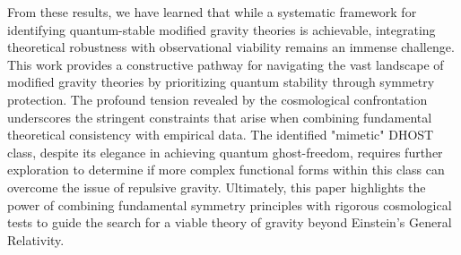 \documentclass[twocolumn]{aastex631}
\begin{document}
From these results, we have learned that while a systematic framework for identifying quantum-stable modified gravity theories is achievable, integrating theoretical robustness with observational viability remains an immense challenge. This work provides a constructive pathway for navigating the vast landscape of modified gravity theories by prioritizing quantum stability through symmetry protection. The profound tension revealed by the cosmological confrontation underscores the stringent constraints that arise when combining fundamental theoretical consistency with empirical data. The identified "mimetic" DHOST class, despite its elegance in achieving quantum ghost-freedom, requires further exploration to determine if more complex functional forms within this class can overcome the issue of repulsive gravity. Ultimately, this paper highlights the power of combining fundamental symmetry principles with rigorous cosmological tests to guide the search for a viable theory of gravity beyond Einstein's General Relativity.
\end{document}
